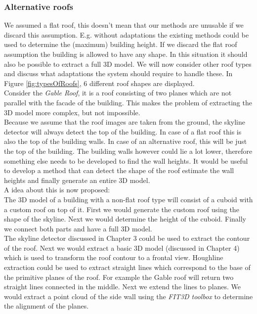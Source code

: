 \subsubsection{Alternative roofs}
We assumed a flat roof, this doesn't mean that our methods are unusable if
we discard this assumption.
E.g. without adaptations the existing methods could be used to determine the (maximum)
building height. 
If we discard the flat roof assumption the building is allowed to have any
shape. In this situation it should also be possible to extract a
full 3D model.  We will now consider other roof types and discuss what
adaptations the system should require to handle these.  In Figure
\ref{fig:typesOfRoofs}, 6 different roof shapes are displayed.\\

Consider the \emph{Gable Roof}, it is a roof consisting of two planes
which are not parallel with the facade of the building. This makes the problem
of extracting the 3D model more complex, but not impossible. \\
Because we assume that the roof images are taken from the ground, the skyline
detector will always detect the top of the building. In case of a flat roof
this is also the top of the building walls. In case of an
alternative roof, this will be just the top of the building. The building walls however
could lie a lot lower, therefore something else needs to be developed to find the wall
heights. It would be useful to develop a method that can detect the shape of the roof 
estimate the wall heights and finally generate an entire 3D model.\\
A idea about this is now proposed:\\

The 3D model of a building with a non-flat roof type will consist of a cuboid 
with a custom roof on top of it.  First we would generate the custom roof 
using the shape of the skyline.  Next we would determine the height of the
cuboid. Finally we connect both parts and have a full 3D model.\\

The skyline detector discussed in Chapter 3 could be used to extract the contour
of the roof. Next we would extract a basic 3D model (discussed in Chapter 4) which
is used to transform the roof contour to a frontal view.  Houghline
extraction could be used to extract straight lines which correspond to the base of
the primitive planes of the roof.  For example the Gable roof will return two
straight lines connected in the middle. Next we extend the lines to planes.
We would extract a point cloud of the side wall using the \emph{FIT3D toolbox\cite{FIT3D}} 
to determine the alignment of the planes.\\

